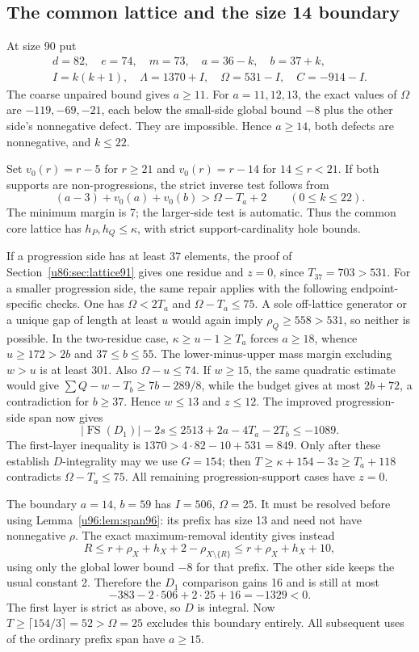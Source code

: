 \documentclass[11pt,a4paper]{article}
\theoremstyle{remark}
\newcommand{\FS}{\operatorname{FS}}
\begin{document}
\subsection{The common lattice and the size 14 boundary}
At size 90 put
\begin{gather*}
 d=82,\quad e=74,\quad m=73,\quad a=36-k,\quad b=37+k,\\
 I=k(k+1),\quad\Lambda=1370+I,\quad\Omega=531-I,\quad C=-914-I.
\end{gather*}
The coarse unpaired bound gives $a\ge11$. For $a=11,12,13$, the
exact values of $\Omega$ are $-119,-69,-21$, each below the small-side
global bound $-8$ plus the other side's nonnegative defect. They are
impossible. Hence $a\ge14$, both defects are nonnegative, and $k\le22$.

Set $v_0(r)=r-5$ for $r\ge21$ and $v_0(r)=r-14$ for $14\le r<21$.
If both supports are non-progressions, the strict inverse test follows from
\[
 (a-3)+v_0(a)+v_0(b)>\Omega-T_a+2\qquad(0\le k\le22).
\]
The minimum margin is 7; the larger-side test is automatic.
Thus the common core lattice has $h_P,h_Q\le\kappa$, with strict
support-cardinality hole bounds.

If a progression side has at least 37 elements, the proof of
Section~\ref{u86:sec:lattice91} gives one residue and $z=0$, since
$T_{37}=703>531$. For a smaller progression side, the same repair
applies with the following endpoint-specific checks. One has
$\Omega<2T_a$ and $\Omega-T_a\le75$. A sole off-lattice generator
or a unique gap of length at least $u$ would again imply
$\rho_Q\ge558>531$, so neither is possible. In the two-residue case,
$\kappa\ge u-1\ge T_a$ forces $a\ge18$, whence
$u\ge172>2b$ and $37\le b\le55$.
The lower-minus-upper mass margin excluding $w>u$ is at least 301.
Also $\Omega-u\le74$. If $w\ge15$, the same quadratic estimate would
give $\sum Q-w-T_b\ge7b-289/8$, while the budget gives at most
$2b+72$, a contradiction for $b\ge37$. Hence $w\le13$ and $z\le12$.
The improved progression-side span now gives
\[
 |\FS(D_1)|-2s\le2513+2a-4T_a-2T_b\le-1089.
\]
The first-layer inequality is $1370>4\cdot82-10+531=849$.
Only after these establish $D$-integrality may we use $G=154$;
then $T\ge\kappa+154-3z\ge T_a+118$ contradicts
$\Omega-T_a\le75$. All remaining progression-support cases have $z=0$.

The boundary $a=14$, $b=59$ has $I=506$, $\Omega=25$.
It must be resolved before using Lemma~\ref{u96:lem:span96}: its prefix has
size 13 and need not have nonnegative $\rho$.
The exact maximum-removal identity gives instead
\[
 R\le r+\rho_X+h_X+2-\rho_{X\setminus\{R\}}
 \le r+\rho_X+h_X+10,
\]
using only the global lower bound $-8$ for that prefix. The other side
keeps the usual constant 2. Therefore the $D_1$ comparison gains 16 and
is still at most
\[
 -383-2\cdot506+2\cdot25+16=-1329<0.
\]
The first layer is strict as above, so $D$ is integral. Now
$T\ge\lceil154/3\rceil=52>\Omega=25$ excludes this boundary entirely.
All subsequent uses of the ordinary prefix span have $a\ge15$.
\end{document}
